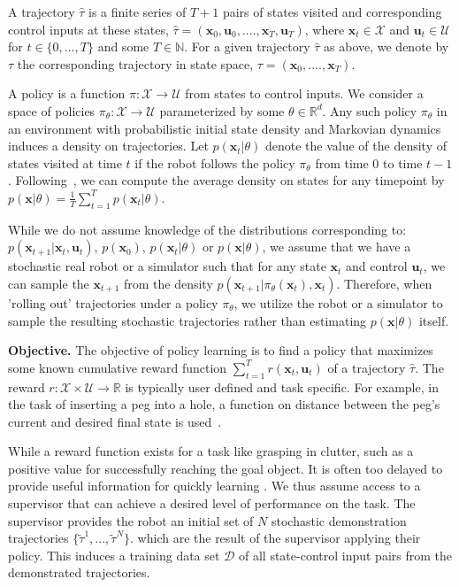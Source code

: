 \documentclass[10pt, conference]{ieeeconf}      %
\newcommand{\bu}{\mathbf{u}}
\newcommand{\bx}{\mathbf{x}}
\begin{document}
A trajectory $\hat{\tau}$ is a finite series of $T+1$ pairs of states visited and corresponding
control inputs at these states, $\hat{\tau} = (\mathbf{x}_0,\mathbf{u}_0, ...., \mathbf{x}_T,\mathbf{u}_T)$, where $\bx_t\in \mathcal{X}$
and $\bu_t\in \mathcal{U}$ for $t\in \{0, \ldots, T\}$ and some $T\in \mathbb{N}$.  
For a given trajectory $\hat{\tau}$ as above, we denote by ${\tau}$ the corresponding trajectory in state space,
${\tau} = (\bx_0,....,\bx_T)$.


A policy is a function $\pi: \mathcal{X} \to \mathcal{U}$ from states to control inputs. 
We consider a space of policies $\pi_{\theta}:\mathcal{X}\to \mathcal{U}$ parameterized by some $\theta\in \mathbb{R}^d$. Any such policy $\pi_{\theta}$ in an environment with probabilistic initial state density and Markovian dynamics
induces a density on trajectories. Let $p(\bx_t|\theta)$ denote the value of the density of states visited at time $t$ if the robot follows the policy
$\pi_{\theta}$ from time $0$ to time $t-1$.  Following~\cite{ross2010reduction}, we can compute
the average density on states for any timepoint by $p(\bx|\theta) = \frac{1}{T} \sum^T_{t=1} p(\bx_t|\theta)$.


While we do not assume knowledge of the distributions corresponding to: $p(\bx_{t+1}|\bx_t,\bu_t)$, $p(\bx_0)$, $p(\bx_t|
\theta)$ or $p(\bx|\theta)$, we assume that we have a stochastic real robot or a simulator such that for any state
$\bx_t$ and control $\bu_t$, we can sample the $\bx_{t+1}$ from the density $p(\bx_{t+1}|\pi_{\theta}(\bx_t),\bx_t)$. 
Therefore, when 'rolling out' trajectories under a policy
$\pi_{\theta}$, we utilize the robot or a simulator to sample the resulting stochastic trajectories rather than
estimating $p(\bx|\theta)$ itself.

\noindent\textbf{Objective.} The objective of  policy learning is to find a policy that maximizes some known cumulative reward function $\sum^T_{t=1} r(\bx_t,\bu_t)$ of a trajectory $\hat{\tau}$. The reward $r:\mathcal{X}\times \mathcal{U}\to \mathbb{R}$ is typically user defined and task specific. 
For example, in the task of inserting a peg into a hole, a function on distance between the peg's current and desired final state is used~\cite{levine2015end}.  

While a reward function exists for a task like grasping in clutter, such as a positive value for successfully reaching the goal object. It is often too delayed to provide useful information for quickly learning \cite{kitaevphysics}. We thus assume access to 
a supervisor that can achieve a desired level of performance on the task. The supervisor provides the robot an initial set
 of $N$ stochastic demonstration trajectories $\lbrace \tilde{\tau}^1,...,\tilde{\tau}^N \rbrace$. 
which are the result of the supervisor applying their policy. This induces a training data set $\mathcal{D}$ of all state-control input pairs from the demonstrated trajectories. 
\end{document}
